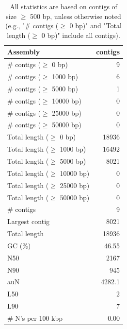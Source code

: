 \documentclass[12pt,a4paper]{article}
\begin{document}
\begin{table}[ht]
\begin{center}
\caption{All statistics are based on contigs of size $\geq$ 500 bp, unless otherwise noted (e.g., "\# contigs ($\geq$ 0 bp)" and "Total length ($\geq$ 0 bp)" include all contigs).}
\begin{tabular}{|l*{1}{|r}|}
\hline
Assembly & contigs \\ \hline
\# contigs ($\geq$ 0 bp) & 9 \\ \hline
\# contigs ($\geq$ 1000 bp) & 6 \\ \hline
\# contigs ($\geq$ 5000 bp) & 1 \\ \hline
\# contigs ($\geq$ 10000 bp) & 0 \\ \hline
\# contigs ($\geq$ 25000 bp) & 0 \\ \hline
\# contigs ($\geq$ 50000 bp) & 0 \\ \hline
Total length ($\geq$ 0 bp) & 18936 \\ \hline
Total length ($\geq$ 1000 bp) & 16492 \\ \hline
Total length ($\geq$ 5000 bp) & 8021 \\ \hline
Total length ($\geq$ 10000 bp) & 0 \\ \hline
Total length ($\geq$ 25000 bp) & 0 \\ \hline
Total length ($\geq$ 50000 bp) & 0 \\ \hline
\# contigs & 9 \\ \hline
Largest contig & 8021 \\ \hline
Total length & 18936 \\ \hline
GC (\%) & 46.55 \\ \hline
N50 & 2167 \\ \hline
N90 & 945 \\ \hline
auN & 4282.1 \\ \hline
L50 & 2 \\ \hline
L90 & 7 \\ \hline
\# N's per 100 kbp & 0.00 \\ \hline
\end{tabular}
\end{center}
\end{table}
\end{document}
